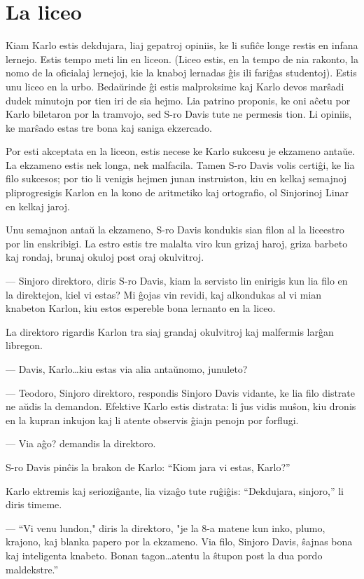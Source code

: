 \chapter{La liceo}

Kiam Karlo estis dekdujara, liaj gepatroj opiniis, ke li sufiĉe longe restis en infana lernejo. Estis tempo meti lin en liceon. (Liceo estis, en la tempo de nia rakonto, la nomo de la oficialaj lernejoj, kie la knaboj lernadas ĝis ili fariĝas studentoj). Estis unu liceo en la urbo. Bedaŭrinde ĝi estis malproksime kaj Karlo devos marŝadi dudek minutojn por tien iri de sia hejmo. Lia patrino proponis, ke oni aĉetu por Karlo biletaron por la tramvojo, sed S-ro Davis tute ne permesis tion. Li opiniis, ke marŝado estas tre bona kaj saniga ekzercado.

Por esti akceptata en la liceon, estis necese ke Karlo sukcesu je ekzameno antaŭe. La ekzameno estis nek longa, nek malfacila. Tamen S-ro Davis volis certiĝi, ke lia filo sukcesos; por tio li venigis hejmen junan instruiston, kiu en kelkaj semajnoj pliprogresigis Karlon en la kono de aritmetiko kaj ortografio, ol Sinjorinoj Linar en kelkaj jaroj.

Unu semajnon antaŭ la ekzameno, S-ro Davis kondukis sian filon al la liceestro por lin enskribigi. La estro estis tre malalta viro kun grizaj haroj, griza barbeto kaj rondaj, brunaj okuloj post oraj okulvitroj.

— Sinjoro direktoro, diris S-ro Davis, kiam la servisto lin enirigis kun lia filo en la direktejon, kiel vi estas? Mi ĝojas vin revidi, kaj alkondukas al vi mian knabeton Karlon, kiu estos espereble bona lernanto en la liceo.

La direktoro rigardis Karlon tra siaj grandaj okulvitroj kaj malfermis larĝan libregon.

— Davis, Karlo\ldots{}kiu estas via alia antaŭnomo, junuleto?

— Teodoro, Sinjoro direktoro, respondis Sinjoro Davis vidante, ke lia filo distrate ne aŭdis la demandon. Efektive Karlo estis distrata: li ĵus vidis muŝon, kiu dronis en la kupran inkujon kaj li atente observis ĝiajn penojn por forflugi.

— Via aĝo? demandis la direktoro.

S-ro Davis pinĉis la brakon de Karlo: ``Kiom jara vi estas, Karlo?''

Karlo ektremis kaj serioziĝante, lia vizaĝo tute ruĝiĝis: ``Dekdujara, sinjoro,'' li diris timeme.

— ``Vi venu lundon," diris la direktoro, "je la 8-a matene kun inko, plumo, krajono, kaj blanka papero por la ekzameno. Via filo, Sinjoro Davis, ŝajnas bona kaj inteligenta knabeto. Bonan tagon\ldots{}atentu la ŝtupon post la dua pordo maldekstre.''

